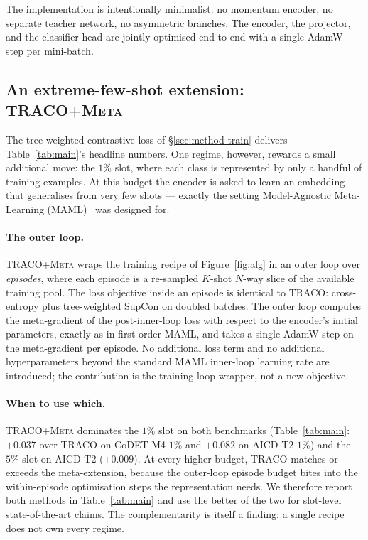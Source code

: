 ﻿\documentclass[11pt]{article}
\newcommand{\method}{\textsc{TRACO}\xspace}
\begin{document}
The implementation is intentionally minimalist: no momentum
encoder, no separate teacher network, no asymmetric branches. The
encoder, the projector, and the classifier head are jointly
optimised end-to-end with a single AdamW step per mini-batch.

\subsection{An extreme-few-shot extension: \method+\textsc{Meta}}
\label{sec:method-meta}

The tree-weighted contrastive loss of \S\ref{sec:method-train}
delivers Table~\ref{tab:main}'s headline numbers. One regime,
however, rewards a small additional move: the $1\%$ slot, where
each class is represented by only a handful of training examples.
At this budget the encoder is asked to learn an embedding that
generalises from very few shots --- exactly the setting Model-Agnostic
Meta-Learning (MAML)~\citep{finn2017maml} was designed for.

\paragraph{The outer loop.} \method+\textsc{Meta} wraps the
training recipe of Figure~\ref{fig:alg} in an outer loop over
\emph{episodes}, where each episode is a re-sampled $K$-shot
$N$-way slice of the available training pool. The loss objective
inside an episode is identical to \method: cross-entropy plus
tree-weighted SupCon on doubled batches. The outer loop computes
the meta-gradient of the post-inner-loop loss with respect to the
encoder's initial parameters, exactly as in first-order MAML, and
takes a single AdamW step on the meta-gradient per episode. No
additional loss term and no additional hyperparameters beyond the
standard MAML inner-loop learning rate are introduced; the
contribution is the training-loop wrapper, not a new objective.

\paragraph{When to use which.} \method+\textsc{Meta} dominates the
$1\%$ slot on both benchmarks (Table~\ref{tab:main}: $+0.037$ over
\method on CoDET-M4 $1\%$ and $+0.082$ on AICD-T2 $1\%$) and the
$5\%$ slot on AICD-T2 ($+0.009$). At every higher budget, \method
matches or exceeds the meta-extension, because the outer-loop
episode budget bites into the within-episode optimisation steps the
representation needs. We therefore report both methods in
Table~\ref{tab:main} and use the better of the two for slot-level
state-of-the-art claims. The complementarity is itself a finding:
a single recipe does not own every regime.
\end{document}
